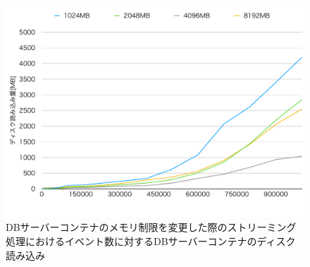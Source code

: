 \documentclass[../../../../../main]{subfiles}
\begin{document}
    \begin{figure}[H]
        \centering
        \includegraphics[width=12cm]{graph}
        \caption{DBサーバーコンテナのメモリ制限を変更した際のストリーミング処理におけるイベント数に対するDBサーバーコンテナのディスク読み込み}
        \label{fig:stream-change-db-memory-limit-db-disk-out-app_4_8192-db_400}
    \end{figure}
\end{document}
